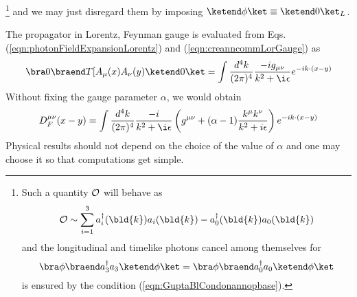 \footnote{%
Such a quantity ${\cal O}$ will behave as
\begin{eqnarray*}
{\cal O} \sim \sum_{i = 1}^3 a^\dagger_i(\bld{k}) a_i(\bld{k})
-
a^\dagger_0(\bld{k}) a_0(\bld{k})
\end{eqnarray*}
and the longitudinal and timelike photons cancel among themselves
for 
\[\bra \phi \braend a_3^\dagger a_3 \ketend \phi \ket
=\bra \phi \braend a_0^\dagger a_0 \ketend \phi \ket
\]
is ensured by the condition (\ref{eqn:GuptaBlCondonannopbase}).
}%
 and we may just disregard
them by imposing $\ketend \phi \ket \equiv \ketend 0 \ket_L$.

The propagator in Lorentz, Feynman gauge is evaluated from
Eqs. (\ref{eqn:photonFieldExpansionLorentz}) and (\ref{eqn:creanncommLorGauge})
as
\begin{eqnarray}
\bra 0 \braend
T[
A_\mu (x) A_\nu (y)
\ketend 0 \ket
=
\int
\frac{d^4 k}{(2\pi)^4}
\frac{-i g_{\mu \nu}}
{k^2 + \i\epsilon}
e^{-ik \cdot (x - y)}
\label{eqn:photonProp}
\end{eqnarray}
Without fixing the gauge parameter $\alpha$, we would obtain
\begin{eqnarray}
D_F^{\mu \nu}(x - y)
=
\int
\frac{d^4 k}{(2\pi)^4}
\frac{-i}
{k^2 + \i\epsilon}
\left(
g^{\mu \nu} + (\alpha - 1)
\frac{k^\mu k^\nu}{k^2+ i\epsilon}
\right)
e^{-ik \cdot (x - y)}
\label{eqn:photonPropalpha}
\end{eqnarray}
Physical results should not depend on the choice of the value of $\alpha$
and one may choose it so that computations get simple.

